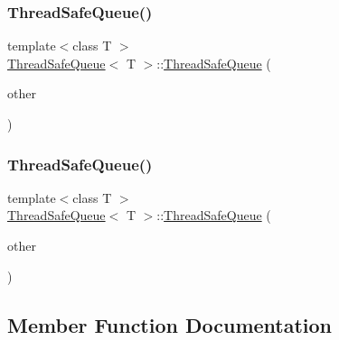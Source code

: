 \subsubsection{\texorpdfstring{Thread\+Safe\+Queue()}{ThreadSafeQueue()}\hspace{0.1cm}{\footnotesize\ttfamily [2/3]}}
{\footnotesize\ttfamily template$<$class T $>$ \\
\hyperlink{class_thread_safe_queue}{Thread\+Safe\+Queue}$<$ T $>$\+::\hyperlink{class_thread_safe_queue}{Thread\+Safe\+Queue} (\begin{DoxyParamCaption}\item[{const \hyperlink{class_thread_safe_queue}{Thread\+Safe\+Queue}$<$ T $>$ \&}]{other }\end{DoxyParamCaption})\hspace{0.3cm}{\ttfamily [delete]}}

\mbox{\label{class_thread_safe_queue_a51c1e1c4eb980e2cb5d3012de447bbd5}} 
\subsubsection{\texorpdfstring{Thread\+Safe\+Queue()}{ThreadSafeQueue()}\hspace{0.1cm}{\footnotesize\ttfamily [3/3]}}
{\footnotesize\ttfamily template$<$class T $>$ \\
\hyperlink{class_thread_safe_queue}{Thread\+Safe\+Queue}$<$ T $>$\+::\hyperlink{class_thread_safe_queue}{Thread\+Safe\+Queue} (\begin{DoxyParamCaption}\item[{const \hyperlink{class_thread_safe_queue}{Thread\+Safe\+Queue}$<$ T $>$ \&\&}]{other }\end{DoxyParamCaption})\hspace{0.3cm}{\ttfamily [delete]}}



\subsection{Member Function Documentation}
\mbox{\label{class_thread_safe_queue_a58b5532baa6110071f697ad1f9bfbf58}} 
